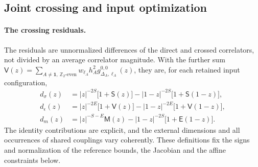 \subsection{Joint crossing and input optimization}\label{sri:app:cone:optimization}
\paragraph{The crossing residuals.} The residuals are unnormalized differences of the direct and crossed correlators,
not divided by an average correlator magnitude. With the further sum
$\mathsf V(z)=\sum_{A\ne\mathbf 1,\ \mathbb Z_2\text{-even}}w_{\ell_A}h_A^2g_{\Delta_A,\ell_A}^{0,0}(z)$, they are, for
each retained input configuration,
\begin{equation}
\begin{aligned}
 d_\sigma(z)&=|z|^{-2S}\bigl[1+\mathsf S(z)\bigr]-|1-z|^{-2S}\bigl[1+\mathsf S(1-z)\bigr],\\
 d_\epsilon(z)&=|z|^{-2E}\bigl[1+\mathsf V(z)\bigr]-|1-z|^{-2E}\bigl[1+\mathsf V(1-z)\bigr],\\
 d_m(z)&=|z|^{-S-E}\mathsf M(z)-|1-z|^{-2S}\bigl[1+\mathsf E(1-z)\bigr].
\end{aligned}
 \label{sri:eq:cone:residuals}
\end{equation}
The identity contributions are explicit, and the external dimensions and all occurrences of shared couplings vary
coherently. These definitions fix the signs and normalization of the reference bounds, the Jacobian and the affine
constraints below.

